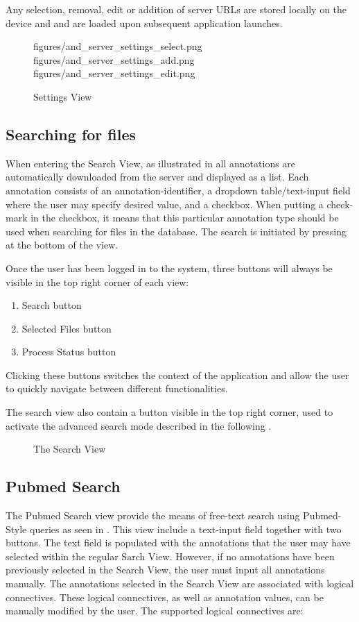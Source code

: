 Any selection, removal, edit or addition of server URLs are stored locally on the device and and are loaded upon subsequent application launches.


\begin{figure}[h]
\addThreeImages
{figures/and_server_settings_select.png}
{figures/and_server_settings_add.png}
{figures/and_server_settings_edit.png}
\caption{Settings View}
\label{fig:and_settings_man}
\end{figure}
\FloatBarrier


\subsection{Searching for files}\label{sec:and_search}

When entering the Search View, as illustrated in  all annotations are automatically downloaded from the server and displayed as a list. Each annotation consists of an annotation-identifier, a dropdown table/text-input field where the user may specify desired value, and a checkbox. When putting a check-mark in the checkbox, it means that this particular annotation type should be used when searching for files in the database. The search is initiated by pressing  at the bottom of the view.

Once the user has been logged in to the system, three buttons will always be visible in the top right corner of each view:
\begin{enumerate}
\item Search button
\item Selected Files button
\item Process Status button
\end{enumerate}

Clicking these buttons switches the context of the application and allow the user to quickly navigate between different functionalities.

The search view also contain a button visible in the top right corner, used to activate the advanced search mode described in the following . 

\begin{figure}[h]
\caption{The Search View}
\label{fig:and_search_man}
\end{figure}
\FloatBarrier


\subsection{Pubmed Search}\label{sec:and_search_pub}
The Pubmed Search view provide the means of free-text search using Pubmed-Style queries as seen in . This view include a text-input field together with two buttons. The text field  is populated with the annotations that the user may have selected within the regular Sarch View. However, if no annotations have been previously selected in the Search View, the user must input all annotations manually. The annotations selected in the Search View are associated with logical connectives. These logical connectives, as well as annotation values, can be manually modified by the user. The supported logical connectives are: 

